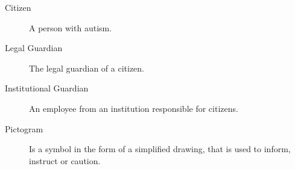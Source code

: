 \begin{description}
\item[Citizen] A person with autism.
\item[Legal Guardian] The legal guardian of a citizen.
\item[Institutional Guardian] An employee from an institution responsible for citizens.
\item[Pictogram] Is a symbol in the form of a simplified drawing, that is used to inform, instruct or caution.
\end{description}